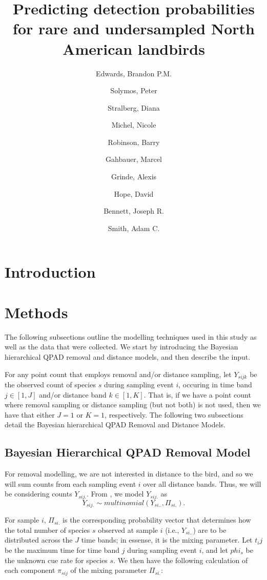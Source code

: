 \documentclass[12pt]{article}
\title{Predicting detection probabilities for rare and undersampled North American landbirds}
\author{
	Edwards, Brandon P.M.\\
	\and
	Solymos, Peter\\
	\and
	Stralberg, Diana\\
	\and
	Michel, Nicole\\
	\and
	Robinson, Barry\\
	\and
	Gahbauer, Marcel\\
	\and
	Grinde, Alexis\\
	\and
	Hope, David\\
	\and
	Bennett, Joseph R.\\
	\and
	Smith, Adam C.\\
}
\begin{document}
\maketitle

\begin{abstract}

\end{abstract}

\section{Introduction}

\section{Methods}

\par The following subsections outline the modelling techniques used in this study as well as the data that were collected. 
We start by introducing the Bayesian hierarchical QPAD removal and distance models, and then describe the input.

\par For any point count that employs removal and/or distance sampling, let $Y_{sijk}$ be the observed count of species $s$ during sampling event $i$, occuring in time band $j \in [1,J]$ and/or distance band $k \in [1,K]$.
That is, if we have a point count where removal sampling or distance sampling (but not both) is not used, then we have that either $J = 1$ or $K = 1$, respectively. 
The following two subsections detail the Bayesian hierarchical QPAD Removal and Distance Models.

\subsection{Bayesian Hierarchical QPAD Removal Model}

\par For removal modelling, we are not interested in distance to the bird, and so we will sum counts from each sampling event $i$ over all distance bands. 
Thus, we will be considering counts $Y_{sij.}$. 
From \citet{solymos_calibrating_2013}, we model $Y_{sij.}$ as
$$Y_{sij.} \sim multinomial\left(Y_{si..}, \Pi_{si.}\right).$$

\par For sample $i$, $\Pi_{si.}$ is the corresponding probability vector that determines how the total number of species $s$ observed at sample $i$ (i.e., $Y_{si..}$) are to be distributed across the $J$ time bands; in essense, it is the mixing parameter.
Let $t_ij$ be the maximum time for time band $j$ during sampling event $i$, and let $phi_s$ be the unknown cue rate for species $s$.
We then have the following calculation of each component $\pi_{sij}$ of the mixing parameter $\Pi_{si.}$:
\end{document}

